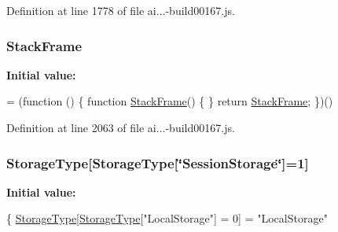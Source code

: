 Definition at line 1778 of file ai...-\/build00167.\+js.

\subsubsection[{\texorpdfstring{Stack\+Frame}{StackFrame}}]{ Stack\+Frame}\hypertarget{_scripts_2ai_80_822_89-build00167_8js_afa75643fbcc744bd76f3e6c5aa7df205}{}\label{_scripts_2ai_80_822_89-build00167_8js_afa75643fbcc744bd76f3e6c5aa7df205}
{\bfseries Initial value\+:}
\begin{DoxyCode}
= (\textcolor{keyword}{function} () \{
        \textcolor{keyword}{function} \hyperlink{obj_2_release_2_package_2_package_tmp_2_scripts_2ai_80_822_89-build00167_8js_afa75643fbcc744bd76f3e6c5aa7df205}{StackFrame}() \{
        \}
        \textcolor{keywordflow}{return} \hyperlink{obj_2_release_2_package_2_package_tmp_2_scripts_2ai_80_822_89-build00167_8js_afa75643fbcc744bd76f3e6c5aa7df205}{StackFrame};
    \})()
\end{DoxyCode}


Definition at line 2063 of file ai...-\/build00167.\+js.

\subsubsection[{\texorpdfstring{Storage\+Type}{StorageType}}]{\setlength{\rightskip}{0pt plus 5cm}Storage\+Type\mbox{[}Storage\+Type\mbox{[}\char`\"{}Session\+Storage\char`\"{}\mbox{]}=1\mbox{]}}\hypertarget{_scripts_2ai_80_822_89-build00167_8js_a48773dc305f9a6b59e02732bccf539e9}{}\label{_scripts_2ai_80_822_89-build00167_8js_a48773dc305f9a6b59e02732bccf539e9}
{\bfseries Initial value\+:}
\begin{DoxyCode}
\{
            \hyperlink{obj_2_release_2_package_2_package_tmp_2_scripts_2ai_80_822_89-build00167_8js_a48773dc305f9a6b59e02732bccf539e9}{StorageType}[\hyperlink{obj_2_release_2_package_2_package_tmp_2_scripts_2ai_80_822_89-build00167_8js_a48773dc305f9a6b59e02732bccf539e9}{StorageType}[\textcolor{stringliteral}{"LocalStorage"}] = 0] = \textcolor{stringliteral}{"LocalStorage"}
\end{DoxyCode}


